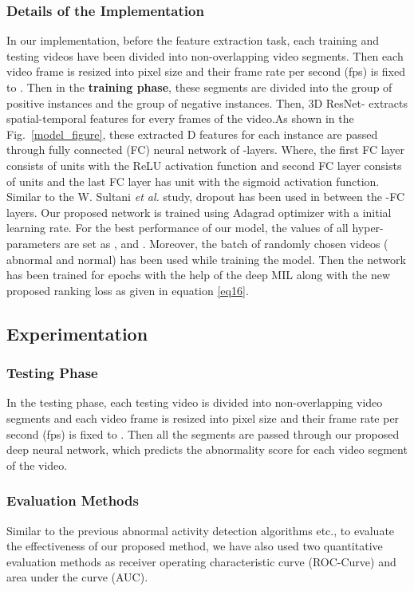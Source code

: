 \documentclass[conference]{IEEEtran}
\begin{document}
\subsubsection{Details of the Implementation} \label{detImple}
In our implementation, before the feature extraction task, each training and testing videos have been divided into  non-overlapping video segments. Then each video frame is resized into  pixel size and their frame rate per second (fps) is fixed to . Then in the \textbf{training phase},  these segments are divided into the group of positive instances and the group of negative instances. Then, 3D ResNet- \cite{A5, A13} extracts spatial-temporal features for every  frames of the video.As shown in the Fig.~\ref{model_figure}, these extracted D features for each instance are passed through fully connected (FC) neural network of -layers. Where, the first FC layer consists of  units with the ReLU activation function and second FC layer consists of  units and the last FC layer has  unit with the sigmoid activation function. Similar to the W. Sultani \textit{et al.} \cite{A6} study,  dropout has been used in between the -FC layers. Our proposed network is trained using Adagrad optimizer with a  initial learning rate. For the best performance of our model, the values of all hyper-parameters are set as \cite{A6},  and .
Moreover, the batch of  randomly chosen videos ( abnormal and  normal) has been used while training the model. Then the network has been trained for  epochs with the help of the deep MIL along with the new proposed ranking loss as given in equation \ref{eq16}. 


\subsection{Experimentation} \label{Exper}
\subsubsection {Testing Phase} \label{Test}
In the testing phase, each testing video is divided into  non-overlapping video segments and each video frame is resized into  pixel size and their frame rate per second (fps) is fixed to . Then all the segments are passed through our proposed deep neural network, which predicts the abnormality score for each video segment of the video.  
 
\subsubsection{Evaluation Methods} \label{EvalMet}
Similar to the previous abnormal activity detection algorithms \cite{A6, A9, A11} etc., to evaluate the effectiveness of our proposed method, we have also used two quantitative evaluation methods as receiver operating characteristic curve (ROC-Curve) and area under the curve (AUC). 
\end{document}
